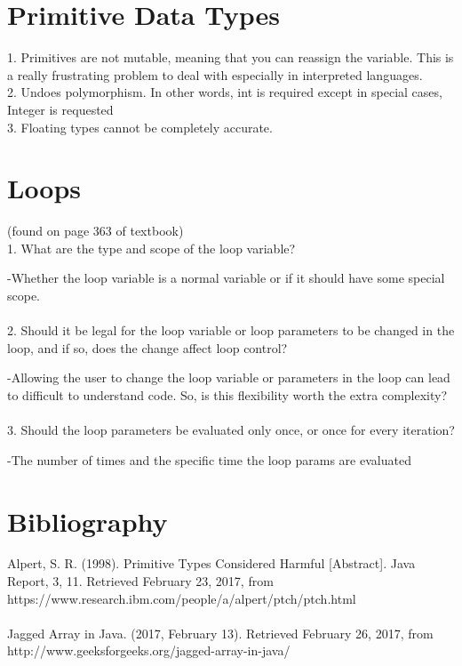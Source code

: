 \documentclass[10pt,letterpaper]{article}
\begin{document}
\section{Primitive Data Types}
1. Primitives are not mutable, meaning that you can reassign the variable. This is a really frustrating problem to deal with especially in interpreted languages. \\
2. Undoes polymorphism. In other words, int is required except in special cases, Integer is requested \\
3. Floating types cannot be completely accurate. 

\section{Loops}
(found on page 363 of textbook)\\
1. What are the type and scope of the loop variable?


-Whether the loop variable is a normal variable or if it should have some special scope.\\\\
2. Should it be legal for the loop variable or loop parameters to be changed in the loop, and if so, does the change affect loop control?

-Allowing the user to change the loop variable or parameters in the loop can lead to difficult to understand code. So, is this flexibility worth the extra complexity?\\\\
3. Should the loop parameters be evaluated only once, or once for every iteration? 

-The number of times and the specific time the loop params are evaluated 

\section{Bibliography}
Alpert, S. R. (1998). Primitive Types Considered Harmful [Abstract]. Java Report, 3, 11. Retrieved February 23, 2017, from https://www.research.ibm.com/people/a/alpert/ptch/ptch.html
\\\\
Jagged Array in Java. (2017, February 13). Retrieved February 26, 2017, from http://www.geeksforgeeks.org/jagged-array-in-java/
\end{document}
